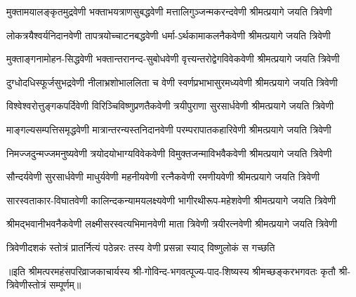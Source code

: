 
\twolineshloka
{मुक्तामयालङ्कृतमुद्रवेणी भक्ताभयत्राणसुबद्धवेणी}
{मत्तालिगुञ्जन्मकरन्दवेणी श्रीमत्प्रयागे जयति त्रिवेणी}%

\twolineshloka
{लोकत्रयैश्वर्यनिदानवेणी तापत्रयोच्चाटनबद्धवेणी}
{धर्मा-ऽर्थकामाकलनैकवेणी श्रीमत्प्रयागे जयति त्रिवेणी}%

\twolineshloka
{मुक्ताङ्गनामोहन-सिद्धवेणी भक्तान्तरानन्द-सुबोधवेणी}
{वृत्त्यन्तरोद्वेगविवेकवेणी श्रीमत्प्रयागे जयति त्रिवेणी}%

\twolineshloka
{दुग्धोदधिस्फूर्जसुभद्रवेणी नीलाभ्रशोभाललिता च वेणी}
{स्वर्णप्रभाभासुरमध्यवेणी श्रीमत्प्रयागे जयति त्रिवेणी}%

\twolineshloka
{विश्वेश्वरोत्तुङ्गकपर्दिवेणी विरिञ्चिविष्णुप्रणतैकवेणी}
{त्रयीपुराणा सुरसार्धवेणी श्रीमत्प्रयागे जयति त्रिवेणी}%

\twolineshloka
{माङ्गल्यसम्पत्तिसमृद्धवेणी मात्रान्तरन्यस्तनिदानवेणी}
{परम्परापातकहारिवेणी श्रीमत्प्रयागे जयति त्रिवेणी}%

\twolineshloka
{निमज्जदुन्मज्जमनुष्यवेणी त्रयोदयोभाग्यविवेकवेणी}
{विमुक्तजन्माविभवैकवेणी श्रीमत्प्रयागे जयति त्रिवेणी}%

\twolineshloka
{सौन्दर्यवेणी सुरसार्धवेणी माधुर्यवेणी महनीयवेणी}
{रत्नैकवेणी रमणीयवेणी श्रीमत्प्रयागे जयति त्रिवेणी}%

\twolineshloka
{सारस्वताकार-विघातवेणी कालिन्दकन्यामयलक्ष्यवेणी}
{भागीरथीरूप-महेशवेणी श्रीमत्प्रयागे जयति त्रिवेणी}%

\twolineshloka
{श्रीमद्भवानीभवनैकवेणी लक्ष्मीसरस्वत्यभिमानवेणी}
{माता त्रिवेणी त्रयीरत्नवेणी श्रीमत्प्रयागे जयति त्रिवेणी}%

\twolineshloka
{त्रिवेणीदशकं स्तोत्रं प्रातर्नित्यं पठेन्नरः}
{तस्य वेणी प्रसन्ना स्याद् विष्णुलोकं स गच्छति}%

॥इति श्रीमत्परमहंसपरिव्राजकाचार्यस्य श्री-गोविन्द-भगवत्पूज्य-पाद-शिष्यस्य
श्रीमच्छङ्करभगवतः कृतौ श्री-त्रिवेणीस्तोत्रं सम्पूर्णम्॥